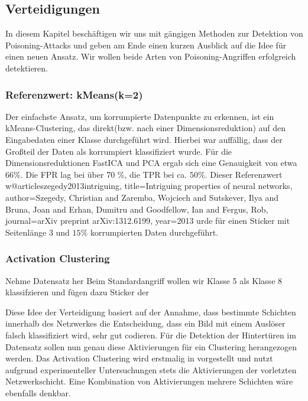 \documentclass[11pt,a4paper]{article}
\numberwithin{equation}{section}
\begin{document}
	\subsection{Verteidigungen}
	In diesem Kapitel beschäftigen wir uns mit gängigen Methoden zur Detektion von Poisoning-Attacks und geben am Ende einen kurzen Ausblick auf die Idee für einen neuen Ansatz.
	Wir wollen beide Arten von Poisoning-Angriffen erfolgreich detektieren. 
	
	\subsubsection{Referenzwert: kMeans(k=2)}
	Der einfachste Ansatz, um korrumpierte Datenpunkte zu erkennen, ist ein kMeans-Clustering, das direkt(bzw. nach einer Dimensionsreduktion) auf den Eingabedaten einer Klasse durchgeführt wird. Hierbei war auffällig, dass der Großteil der Daten als korrumpiert klassifiziert wurde. Für die Dimensionsreduktionen FastICA und PCA ergab sich eine Genauigkeit von etwa $66 \%$. Die FPR lag bei über 70 \%, die TPR bei ca. $50 \%$.
	Dieser Referenzwert w@article{szegedy2013intriguing,
		title={Intriguing properties of neural networks},
		author={Szegedy, Christian and Zaremba, Wojciech and Sutskever, Ilya and Bruna, Joan and Erhan, Dumitru and Goodfellow, Ian and Fergus, Rob},
		journal={arXiv preprint arXiv:1312.6199},
		year={2013}
	}
	urde für einen Sticker mit Seitenlänge 3 und $15 \%$ korrumpierten Daten durchgeführt.
	\subsubsection{Activation Clustering}
	
	
		Nehme Datensatz her
		Beim Standardangriff wollen wir Klasse 5 als Klasse 8 klassifzieren und fügen dazu Sticker der  
		
		
		Diese Idee der Verteidigung basiert auf der Annahme, dass bestimmte Schichten innerhalb des Netzwerkes die Entscheidung, dass ein Bild mit einem Auslöser falsch klassifiziert wird, sehr gut codieren. Für die Detektion der Hintertüren im Datensatz sollen nun genau diese Aktivierungen für ein Clustering herangezogen werden.
		Das Activation Clustering wird erstmalig in \cite{AC} vorgestellt und nutzt aufgrund experimenteller Untersuchungen stets die Aktivierungen der vorletzten Netzwerkschicht.
		Eine Kombination von Aktivierungen mehrere Schichten wäre ebenfalls denkbar.
				
\end{document}
